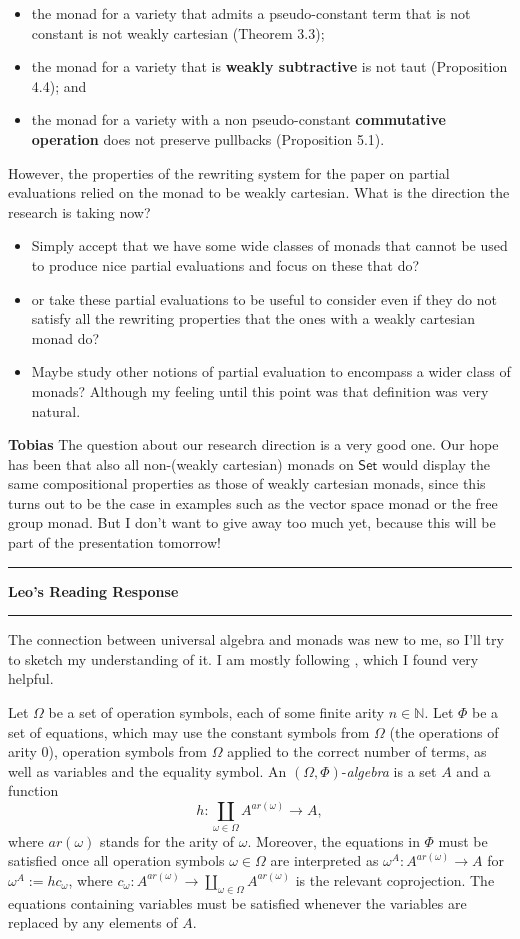 \documentclass{amsart}
\newcommand{\iam}[1]{
  \vspace{0.25em}
  \hrule
  \vspace{0.25em}
  \textbf{{#1}'s Reading Response}
  \vspace{0.25em}
  \hrule
  \vspace{1em}
}
\newcommand{\respond}[1]{
  \vspace{1em} \textbf{#1}
}
\newcommand{\N}{\mathbb N}
\begin{document}
\begin{itemize}
\item the monad for a variety that admits a pseudo-constant term that
  is not constant is not weakly cartesian (Theorem 3.3);
\item the monad for a variety that is \textbf{weakly subtractive} is
  not taut (Proposition 4.4); and
\item the monad for a variety with a non pseudo-constant
  \textbf{commutative operation} does not preserve pullbacks
  (Proposition 5.1).
\end{itemize}

However, the properties of the rewriting system for the paper on
partial evaluations relied on the monad to be weakly cartesian.  What
is the direction the research is taking now?

\begin{itemize}
\item Simply accept that we have some wide classes of monads that
  cannot be used to produce nice partial evaluations and focus on
  these that do?
\item or take these partial evaluations to be useful to consider even
  if they do not satisfy all the rewriting properties that the ones
  with a weakly cartesian monad do?
\item Maybe study other notions of partial evaluation to encompass a
  wider class of monads? Although my feeling until this point was that
  definition was very natural.
\end{itemize}

\respond{Tobias} The question about our research direction is a very good one. Our hope has been that also all non-(weakly cartesian) monads on $\mathsf{Set}$ would display the same compositional properties as those of weakly cartesian monads, since this turns out to be the case in examples such as the vector space monad or the free group monad. But I don't want to give away too much yet, because this will be part of the presentation tomorrow!

\iam{Leo}
The connection between universal algebra and monads was new to me, so I'll try to sketch my understanding of it. I am mostly following \cite{Voutas}, which I found very helpful.

Let $\Omega$ be a set of operation symbols, each of some finite arity $n\in\N$. Let $\Phi$ be a set of equations, which may use the constant symbols from $\Omega$ (the operations of arity $0$), operation symbols from $\Omega$ applied to the correct number of terms, as well as variables and the equality symbol. An $(\Omega,\Phi)$-{\em algebra} is a set $A$ and a function
$$h : \coprod_{\omega\in\Omega} A^{ar(\omega)}\rightarrow A,$$
where $ar(\omega)$ stands for the arity of $\omega$. Moreover, the equations in $\Phi$ must be satisfied once all operation symbols $\omega\in\Omega$ are interpreted as $\omega^A:A^{ar(\omega)}\rightarrow A$ for $\omega^A:=hc_{\omega}$, where $c_{\omega}:A^{ar(\omega)}\rightarrow\coprod_{\omega\in\Omega} A^{ar(\omega)}$ is the relevant coprojection. The equations containing variables must be satisfied whenever the variables are replaced by any elements of $A$.
\end{document}
